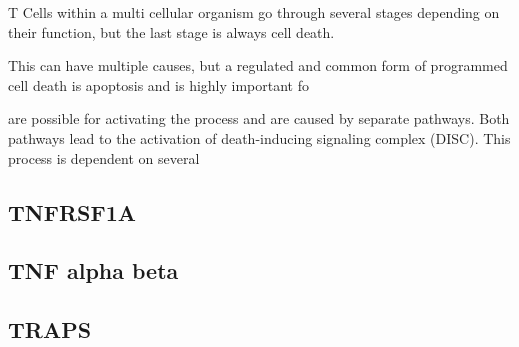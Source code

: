 T
Cells within a multi cellular organism go through several stages depending on their function, but the last stage is always cell death. 


This can have multiple causes, but a regulated and common form of programmed cell death is apoptosis and is highly important fo


 are possible for activating the process and are caused by separate pathways. 
Both pathways lead to the activation of death-inducing signaling complex (DISC). This process is dependent on several 

\subsection{TNFRSF1A}

\subsection{TNF alpha beta}

\subsection{TRAPS}
